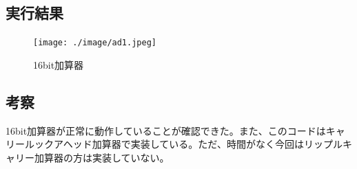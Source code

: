 \documentclass[uplatex]{jsarticle}
\begin{document}
\subsection{実行結果}
\begin{figure}[hbtp]
  \centering
  \texttt{[image: ./image/ad1.jpeg]}
  \caption{16bit加算器}
  \label{ラベル}
\end{figure}

\subsection{考察}
16bit加算器が正常に動作していることが確認できた。また、このコードはキャリールックアヘッド加算器で実装している。ただ、時間がなく今回はリップルキャリー加算器の方は実装していない。
\end{document}
